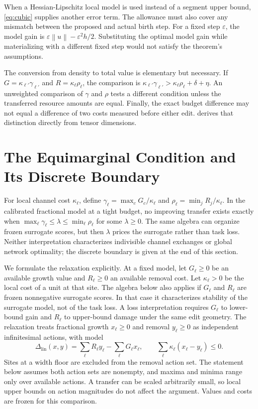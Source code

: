 \documentclass[10pt]{article}
\theoremstyle{paper}
\newcommand{\norm}[1]{\left\lVert #1\right\rVert}
\begin{document}
When a Hessian-Lipschitz local model is used instead of a segment upper bound, \cref{eq:cubic} supplies another error term. The allowance must also cover any mismatch between the proposed and actual birth step. For a fixed step $\varepsilon$, the model gain is $\varepsilon\norm u-\varepsilon^2h/2$. Substituting the optimal model gain while materializing with a different fixed step would not satisfy the theorem's assumptions.

The conversion from density to total value is elementary but necessary. If $G=\kappa_{\ell'}\gamma_{\ell'}$ and $R=\kappa_\ell\rho_\ell$, the comparison is $\kappa_{\ell'}\gamma_{\ell'}>\kappa_\ell\rho_\ell+\delta+\eta$. An unweighted comparison of $\gamma$ and $\rho$ tests a different condition unless the transferred resource amounts are equal. Finally, the exact budget difference may not equal a difference of two costs measured before either edit.  derives that distinction directly from tensor dimensions.

\section{The Equimarginal Condition and Its Discrete Boundary}
\label{app:allocation}
For local channel cost $\kappa_\ell$, define $\gamma_\ell=\max_cG_c/\kappa_\ell$ and $\rho_\ell=\min_jR_j/\kappa_\ell$. In the calibrated fractional model at a tight budget, no improving transfer exists exactly when $\max_\ell\gamma_\ell\le\lambda\le\min_\ell\rho_\ell$ for some $\lambda\ge0$. The same algebra can organize frozen surrogate scores, but then $\lambda$ prices the surrogate rather than task loss. Neither interpretation characterizes indivisible channel exchanges or global network optimality; the discrete boundary is given at the end of this section.

We formulate the relaxation explicitly. At a fixed model, let $G_\ell\ge0$ be an available growth value and $R_\ell\ge0$ an available removal cost. Let $\kappa_\ell>0$ be the local cost of a unit at that site. The algebra below also applies if $G_\ell$ and $R_\ell$ are frozen nonnegative surrogate scores. In that case it characterizes stability of the surrogate model, not of the task loss. A loss interpretation requires $G_\ell$ to lower-bound gain and $R_\ell$ to upper-bound damage under the same edit geometry. The relaxation treats fractional growth $x_\ell\ge0$ and removal $y_\ell\ge0$ as independent infinitesimal actions, with model
\begin{equation}
\Delta_{\mathrm{lin}}(x,y)=\sum_\ell R_\ell y_\ell-\sum_\ell G_\ell x_\ell,
\qquad \sum_\ell\kappa_\ell(x_\ell-y_\ell)\le0.
\label{eq:relax}
\end{equation}
Sites at a width floor are excluded from the removal action set. The statement below assumes both action sets are nonempty, and maxima and minima range only over available actions. A transfer can be scaled arbitrarily small, so local upper bounds on action magnitudes do not affect the argument. Values and costs are frozen for this comparison.
\end{document}
